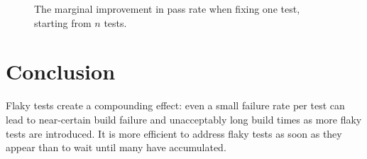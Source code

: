 \documentclass[letterpaper]{article}
\begin{document}
\begin{figure}[ht!]
    \centering
    \caption{The marginal improvement in pass rate when fixing one test, starting from \( n \) tests.}
\end{figure}

\section*{Conclusion}

Flaky tests create a compounding effect: even a small failure rate per test can lead to near-certain build failure and unacceptably long build times as more flaky tests are introduced. It is more efficient to address flaky tests as soon as they appear than to wait until many have accumulated. 
\end{document}

